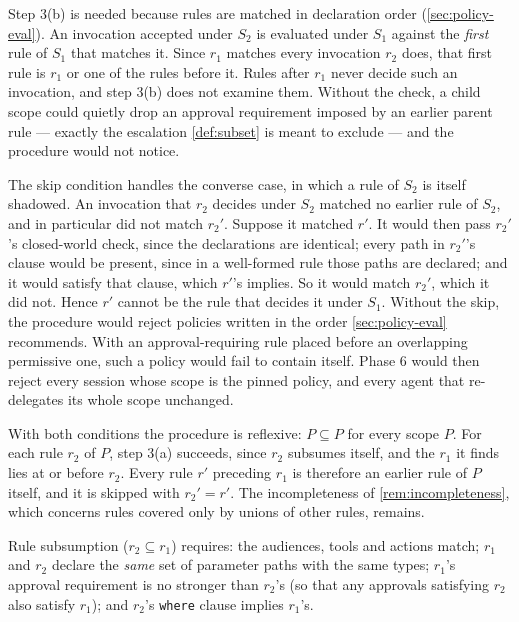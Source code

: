 \documentclass[11pt,a4paper]{article}
\begin{document}
Step 3(b) is needed because rules are matched in declaration order
(\cref{sec:policy-eval}). An invocation accepted under $S_2$ is
evaluated under $S_1$ against the \emph{first} rule of $S_1$ that
matches it. Since $r_1$ matches every invocation $r_2$ does, that first
rule is $r_1$ or one of the rules before it. Rules after $r_1$ never
decide such an invocation, and step 3(b) does not examine them. Without
the check, a child scope could quietly drop an approval requirement
imposed by an earlier parent rule --- exactly the escalation
\cref{def:subset} is meant to exclude --- and the procedure would not
notice.

The skip condition handles the converse case, in which a rule of $S_2$
is itself shadowed. An invocation that $r_2$ decides under $S_2$ matched
no earlier rule of $S_2$, and in particular did not match $r_2'$.
Suppose it matched $r'$. It would then pass $r_2'$'s closed-world check,
since the declarations are identical; every path in $r_2'$'s clause
would be present, since in a well-formed rule those paths are declared;
and it would satisfy that clause, which $r'$'s implies. So it would
match $r_2'$, which it did not. Hence $r'$ cannot be the rule that
decides it under $S_1$.
Without the skip, the procedure would reject policies written in the
order \cref{sec:policy-eval} recommends. With an approval-requiring rule
placed before an overlapping permissive one, such a policy would fail to
contain itself. Phase 6 would then reject every session whose scope is
the pinned policy, and every agent that re-delegates its whole scope
unchanged.

With both conditions the procedure is reflexive: $P \subseteq P$ for
every scope $P$. For each rule $r_2$ of $P$, step 3(a) succeeds, since
$r_2$ subsumes itself, and the $r_1$ it finds lies at or before $r_2$.
Every rule $r'$ preceding $r_1$ is therefore an earlier rule of $P$
itself, and it is skipped with $r_2' = r'$. The incompleteness of
\cref{rem:incompleteness}, which concerns rules covered only by unions
of other rules, remains.

Rule subsumption ($r_2 \subseteq r_1$) requires: the audiences, tools
and actions match; $r_1$ and $r_2$ declare the \emph{same} set of parameter paths
with the same types; $r_1$'s approval requirement is no stronger than
$r_2$'s (so that any approvals satisfying $r_2$ also satisfy $r_1$);
and $r_2$'s \texttt{where} clause implies $r_1$'s.
\end{document}
